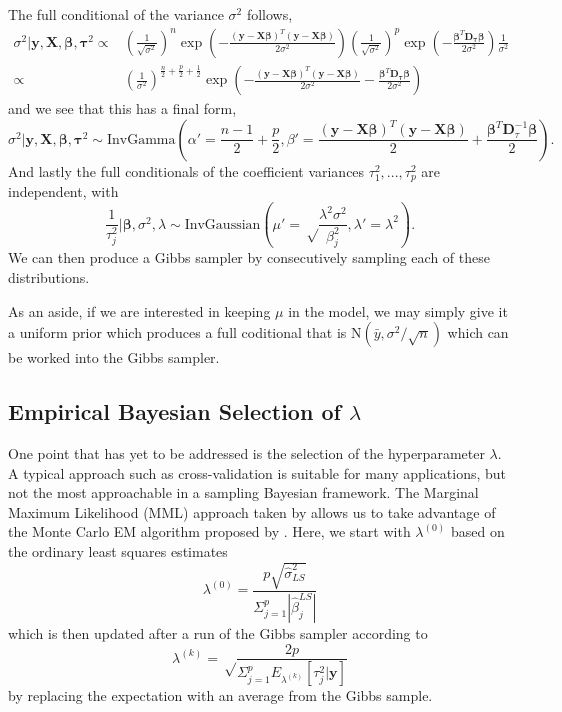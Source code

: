 \documentclass{uwstat572}
\begin{document}
The full conditional of the variance $\sigma^2$ follows, 
\begin{align*}
\sigma^2|\mathbf{y},\mathbf{X},\boldsymbol\beta,\boldsymbol\tau^2 \propto& \left(\frac{1}{\sqrt{\sigma^2}}\right)^n\exp{\left(-\frac{(\mathbf{y}-\mathbf{X}\boldsymbol\beta)^T(\mathbf{y}-\mathbf{X}\boldsymbol\beta)}{2\sigma^2}\right)}\left(\frac{1}{\sqrt{\sigma^2}}\right)^p\exp{\left( -\frac{\boldsymbol\beta^T\mathbf{D}_{\boldsymbol\tau}\boldsymbol\beta}{2\sigma^2} \right)}\frac{1}{\sigma^2}\\
\propto&\left(\frac{1}{\sigma^2}\right)^{\frac{n}{2}+\frac{p}{2}+\frac{1}{2}}\exp{\left(-\frac{(\mathbf{y}-\mathbf{X}\boldsymbol\beta)^T(\mathbf{y}-\mathbf{X}\boldsymbol\beta)}{2\sigma^2}-\frac{\boldsymbol\beta^T\mathbf{D}_{\boldsymbol\tau}\boldsymbol\beta}{2\sigma^2}\right)}
\end{align*}
and we see that this has a final form,
\[ \sigma^2|\mathbf{y},\mathbf{X},\boldsymbol\beta,\boldsymbol\tau^2 \sim \text{InvGamma}\left(\alpha'=\frac{n-1}{2}+\frac{p}{2},\beta'=\frac{(\mathbf{y}-\mathbf{X}\boldsymbol\beta)^T(\mathbf{y}-\mathbf{X}\boldsymbol\beta)}{2}+\frac{\boldsymbol\beta^T\mathbf{D}_\tau^{-1}\boldsymbol\beta}{2}\right). \] And lastly the full conditionals of the coefficient variances $\tau^2_1,...,\tau^2_p$ are independent, with \[
\frac{1}{\tau_j^2} | \boldsymbol\beta, \sigma^2, \lambda \sim \text{InvGaussian}\left(\mu'=\sqrt\frac{\lambda^2\sigma^2}{\beta_j^2}, \lambda'=\lambda^2\right). \] We can then produce a Gibbs sampler by consecutively sampling each of these distributions.

As an aside, if we are interested in keeping $\mu$ in the model, we may simply give it a uniform prior which produces a full coditional that is $\text{N}(\bar{y},\sigma^2/\sqrt{n})$ which can be worked into the Gibbs sampler.

\subsection{Empirical Bayesian Selection of $\lambda$}
One point that has yet to be addressed is the selection of the hyperparameter $\lambda$. A typical approach such as cross-validation is suitable for many applications, but not the most approachable in a sampling Bayesian framework. The Marginal Maximum Likelihood (MML) approach taken by \cite{park2008bayesian} allows us to take advantage of the Monte Carlo EM algorithm proposed by \cite{casella2001empirical}. Here, we start with $\lambda^{(0)}$ based on the ordinary least squares estimates \[ 
\lambda^{(0)}=\frac{p\sqrt{\hat\sigma^2_{LS}}}{\Sigma^p_{j=1}|\hat\beta_j^{LS}|} 
\] which is then updated after a run of the Gibbs sampler according to \[ 
\lambda^{(k)}=\sqrt\frac{2p}{\Sigma^p_{j=1}E_{\lambda^{(k)}}[\tau^2_j|\mathbf{y}]}
\] by replacing the expectation with an average from the Gibbs sample. 
\end{document}
